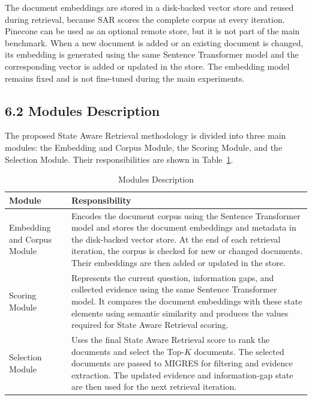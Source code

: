 \documentclass[12pt,a4paper]{report}
\begin{document}
The document embeddings are stored in a disk-backed vector store and
reused during retrieval, because SAR scores the complete corpus at every
iteration. Pinecone can be used as an optional remote store, but
it is not part of the main benchmark. When a new document is added or an
existing document is changed, its embedding is generated using the same
Sentence Transformer model and the corresponding vector is added or
updated in the store. The embedding model remains fixed and is not
fine-tuned during the main experiments.

\subsection*{6.2 Modules Description}

The proposed State Aware Retrieval methodology is divided into three
main modules: the Embedding and Corpus Module, the Scoring Module, and
the Selection Module. Their responsibilities are shown in
Table~\ref{tab:module-description}.

\begin{table}[H]
\centering
\caption{Modules Description}
\label{tab:module-description}
\renewcommand{\arraystretch}{1.25}
\begin{tabular}{|p{1.75in}|p{4.3in}|}
\hline
\textbf{Module} & \textbf{Responsibility} \\ \hline

Embedding and Corpus Module &
Encodes the document corpus using the Sentence Transformer model and
stores the document embeddings and metadata in the disk-backed vector
store. At the end of each retrieval iteration, the corpus is checked for
new or changed documents. Their embeddings are then added or updated in
the store.
\\ \hline

Scoring Module &
Represents the current question, information gaps, and collected
evidence using the same Sentence Transformer model. It compares the
document embeddings with these state elements using semantic
similarity and produces the values required for State Aware Retrieval
scoring. \\ \hline

Selection Module &
Uses the final State Aware Retrieval score to rank the documents and
select the Top-$K$ documents. The selected documents are passed to
MIGRES for filtering and evidence extraction. The updated evidence and
information-gap state are then used for the next retrieval iteration.
\\ \hline

\end{tabular}
\end{table}
\end{document}
